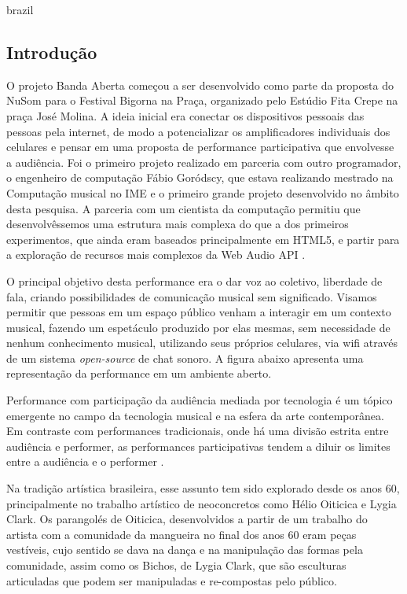 \begin{otherlanguage*}{brazil}
\subsection{Introdução}
O projeto Banda Aberta começou a ser desenvolvido como parte da proposta do NuSom para o Festival Bigorna na Praça, organizado pelo Estúdio Fita Crepe na praça José Molina. A ideia inicial era conectar os dispositivos pessoais das pessoas pela internet, de modo a potencializar os amplificadores individuais dos celulares e pensar em uma proposta de performance participativa que envolvesse a audiência. Foi o primeiro projeto realizado em parceria com outro programador, o engenheiro de computação Fábio Goródscy, que estava realizando mestrado na Computação musical no IME e o primeiro grande projeto desenvolvido no âmbito desta pesquisa. A parceria com um cientista da computação permitiu que desenvolvêssemos uma estrutura mais complexa do que a dos primeiros experimentos, que ainda eram baseados principalmente em HTML5, e partir para a exploração de recursos mais complexos da Web Audio API \cite{Adenot2015}.

O principal objetivo desta performance era o dar voz ao coletivo, liberdade de fala, criando possibilidades de comunicação musical sem significado. Visamos permitir que pessoas em um espaço público venham a interagir em um contexto musical, fazendo um espetáculo produzido por elas mesmas, sem necessidade de nenhum conhecimento musical, utilizando seus próprios celulares, via wifi através de um sistema \emph{open-source} de chat sonoro. A figura abaixo apresenta uma representação da performance em um ambiente aberto. 

Performance com participação da audiência mediada por tecnologia é um tópico emergente no campo da tecnologia musical \cite{wu2017open} e na esfera da arte contemporânea. Em contraste com performances tradicionais, onde há uma divisão estrita entre audiência e performer, as performances participativas tendem a diluir os limites entre a audiência e o performer \cite{kattwinkel2003audience}. 

Na tradição artística brasileira, esse assunto tem sido explorado desde os anos 60, principalmente no trabalho artístico de neoconcretos como Hélio Oiticica e Lygia Clark. Os parangolés de Oiticica, desenvolvidos a partir de um trabalho do artista com a comunidade da mangueira no final dos anos 60 eram peças vestíveis, cujo sentido se dava na dança e na manipulação das formas pela comunidade, assim como os Bichos, de Lygia Clark, que são esculturas articuladas que podem ser manipuladas e re-compostas pelo público. \cite{Braga2008}


\end{otherlanguage*}
